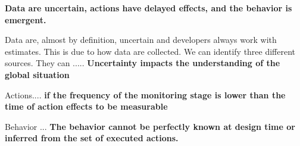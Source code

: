 \bigskip

\textbf{Data are uncertain, actions have delayed effects, and the behavior is emergent.}

Data are, almost by definition, uncertain and developers always work with estimates.
This is due to how data are collected.
We can identify three different sources.
They can .....
\textbf{Uncertainty impacts the understanding of the global situation}

Actions....
\textbf{if the frequency of the monitoring stage is lower than the time of action effects to be measurable}


Behavior ...
\textbf{The behavior cannot be perfectly known at design time or inferred from the set of executed actions.}

\bigskip
















